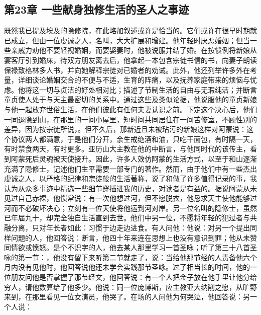 
\subsection{第23章 一些献身独修生活的圣人之事迹}

既然我已提及埃及的隐修院，在此略加叙述或许是恰当的。它们或许在很早时期就已成立，但由一位虔诚之人，名叫，大大扩展和增建。他年轻时厌恶婚姻；但当一些亲戚力劝他不要轻视婚姻，而要娶妻时，他被说服并结了婚。在按惯例将新娘从宴客厅引到婚床，待双方朋友离去后，他拿起一本包含宗徒书信的书，向妻子朗读保禄致格林多人书，并向她解释宗徒对已婚者的劝诫。此外，他还列举许多外在考量，详细谈论婚姻交合的不便与不适，生育的阵痛，以及抚养家庭带来的烦恼与忧虑。他将这一切与贞洁的好处相对比；描述了节制生活的自由与无瑕纯洁；并断言童贞使人处于与天主最密切的关系中。通过这些及类似论据，他说服他的童贞新娘与他一起放弃世俗生活，在他们彼此有任何夫妻认识之前。下定这个决心后，他们一同退隐到山，在那里的一间小屋里，短时间共同居住在一间苦修室，不顾性别的差异，因为按宗徒所说，。但不久后，那新近且未被玷污的新娘这样对阿蒙说：这个协议两人都满意，于是他们分开，余生戒绝酒和油，只吃干面包，有时隔一天，有时禁食两天，有时更多。亚历山大主教在他的中断言，与他同时代的该传主，看到阿蒙死后灵魂被天使接升。因此，许多人效仿阿蒙的生活方式，以至于和山逐渐充满了隐修士，记述他们生平需要一部专门的著作。然而，由于他们中有一些杰出虔诚之人，以严格的纪律和宗徒般的生活著称，说了和做了许多值得记录的事，我认为从众多事迹中精选一些细节穿插进我的历史，对读者是有益的。据说阿蒙从未见过自己赤裸，他惯常说：有一次他想过河，但不愿脱衣，他恳求天主使他能够过河而不必破坏决心；立刻有一位天使将他运到河对岸。另一位名叫的隐修士，虽然已年届九十，却完全独自生活直到去世。他们中另一位，不愿将年轻的犯过者与共融分离，只对年长者如此：习惯于边走边进食。有人问他：他说：对另一个提出同样问题的人，他回答说：断言，他四十年来连在思想上也没有意识到罪；他从未赞同情欲或愤怒。是个不识字的人，他去某人那里学习一首圣咏；听了第三十八首圣咏的第一节：，他没有留下来听第二节就走了，说：当给他那节经的人责备他六个月内没有见他时，他回答说他还未学会实践那节圣咏。过了相当长的时间，他的一位朋友问他是否掌握了那节经文，他回答说：有一个人把金子放在他手里让他分给穷人，请他数算给了他多少。他说：同一位庞博斯，应主教亚大纳削之愿，从旷野来到，在那里看见一位女演员，他哭了。在场的人问他为何哭泣，他回答说：另一个人说：\Quote